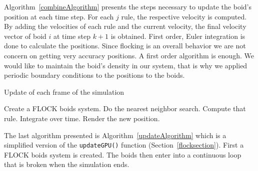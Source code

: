 Algorithm~\ref{combineAlgorithm} presents the steps necessary to update the boid's position at each time step. For each $j$ rule, the respective velocity is computed. By adding the velocities of each rule and the current velocity, the final velocity vector of boid $i$ at time step $k+1$ is obtained. First order, Euler integration is done to calculate the positions. Since flocking is an overall behavior we are not concern on getting very accuracy positions. A first order algorithm is enough. We would like to maintain the boid's density in our system, that is why we applied periodic boundary conditions to the positions to the boids.
 
\begin{algorithm}
\caption{Update of each frame of the simulation}
\label{updateAlgorithm}
\begin{algorithmic}
\STATE Create a FLOCK boids system.
\STATE Do the nearest neighbor search.
\STATE Compute that rule.
\STATE Integrate over time.
\STATE Render the new position.
\ENDFOR
\end{algorithmic}
\end{algorithm}

The last algorithm presented is Algorithm~\ref{updateAlgorithm} which is a simplified version of 
the \texttt{updateGPU()} function (Section~\ref{flocksection}). First a FLOCK boids system is created. The boids then enter into a continuous loop that is broken when the simulation ends. 
